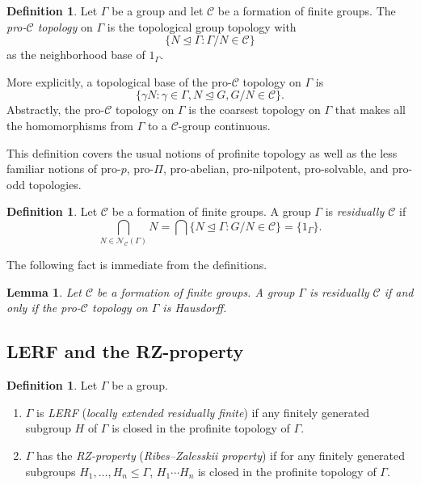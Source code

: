 \documentclass[11pt]{amsart}
\newtheorem{lemma}[theorem]{Lemma}
\theoremstyle{definition}
\newtheorem{definition}[theorem]{Definition}
\theoremstyle{definition}
\numberwithin{equation}{section}
\begin{document}
\begin{definition} Let $\Gamma$ be a group and let $\mathcal{C}$ be a formation of finite groups. The {\em pro-$\mathcal{C}$ topology} on $\Gamma$ is the topological group topology with
$$ \{ N\unlhd \Gamma\colon \Gamma/N\in\mathcal{C}\} $$
as the neighborhood base of $1_\Gamma$.
\end{definition}

More explicitly, a topological base of the pro-$\mathcal{C}$ topology on $\Gamma$ is
$$ \{ \gamma N\colon \gamma\in \Gamma, N\unlhd G, G/N\in\mathcal{C}\}. $$
Abstractly, the pro-$\mathcal{C}$ topology on $\Gamma$ is the coarsest topology on $\Gamma$ that makes all the homomorphisms from $\Gamma$ to a $\mathcal{C}$-group continuous. 

This definition covers the usual notions of profinite topology as well as the less familiar notions of pro-$p$, pro-$\Pi$, pro-abelian, pro-nilpotent, pro-solvable, and pro-odd topologies.

\begin{definition} Let $\mathcal{C}$ be a formation of finite groups. A group $\Gamma$ is {\em residually $\mathcal{C}$} if 
$$ \bigcap_{N\in\mathcal{N}_{\mathcal{C}}(\Gamma)}N=\bigcap\{N\unlhd \Gamma\colon G/N\in \mathcal{C}\}=\{1_\Gamma\}. $$
\end{definition}

The following fact is immediate from the definitions.

\begin{lemma} Let $\mathcal{C}$ be a formation of finite groups. A group $\Gamma$ is residually $\mathcal{C}$ if and only if the pro-$\mathcal{C}$ topology on $\Gamma$ is Hausdorff.
\end{lemma}








\subsection{LERF and the RZ-property}

\begin{definition} Let $\Gamma$ be a group.
\begin{enumerate}
\item[(i)] $\Gamma$ is {\em LERF} ({\em locally extended residually finite}) if any finitely generated subgroup $H$ of $\Gamma$ is closed in the profinite topology of $\Gamma$.
\item[(ii)] $\Gamma$ has the {\em RZ-property} ({\em Ribes--Zalesskii property}) if for any finitely generated subgroups $H_1,\dots, H_n\leq \Gamma$, $H_1\cdots H_n$ is closed in the profinite topology of $\Gamma$.
\end{enumerate}
\end{definition}
\end{document}
